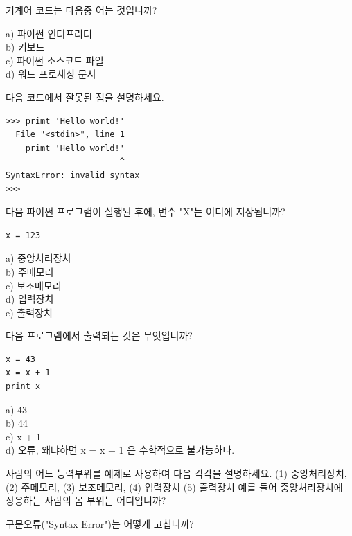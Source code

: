 \begin{ex}
기계어 코드는 다음중 어는 것입니까?

a) 파이썬 인터프리터\\
b) 키보드\\
c) 파이썬 소스코드 파일\\
d) 워드 프로세싱 문서
\end{ex}

\begin{ex}
 다음 코드에서 잘못된 점을 설명하세요.

\beforeverb
\begin{verbatim}
>>> primt 'Hello world!'
  File "<stdin>", line 1
    primt 'Hello world!'
                       ^
SyntaxError: invalid syntax
>>> 
\end{verbatim}
\afterverb

\end{ex}

\begin{ex}
다음 파이썬 프로그램이 실행된 후에, 변수 "X"는 어디에 저장됩니까?

\beforeverb
\begin{verbatim}
x = 123
\end{verbatim}
\afterverb
%
a) 중앙처리장치\\
b) 주메모리\\
c) 보조메모리\\
d) 입력장치\\
e) 출력장치
\end{ex}

\begin{ex}
다음 프로그램에서 출력되는 것은 무엇입니까?

\beforeverb
\begin{verbatim}
x = 43
x = x + 1
print x
\end{verbatim}
\afterverb
%
a) 43\\
b) 44\\
c) x + 1\\
d) 오류, 왜냐하면 x = x + 1 은 수학적으로 불가능하다.
\end{ex}

\begin{ex}
사람의 어느 능력부위를 예제로 사용하여 다음 각각을 설명하세요.
(1) 중앙처리장치, (2) 주메모리, (3) 보조메모리, 
(4) 입력장치
(5) 출력장치
예를 들어 중앙처리장치에 상응하는 사람의 몸 부위는 어디입니까? 
\end{ex}

\begin{ex}
구문오류("Syntax Error")는 어떻게 고칩니까?
\end{ex}


